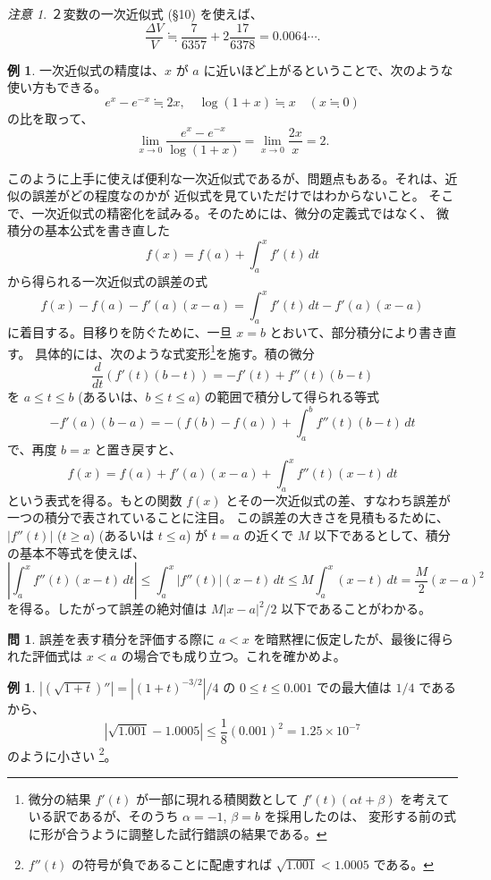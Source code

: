 \documentclass[a4paper]{jsarticle}
\theoremstyle{definition}
\newtheorem{Example}[Theorem]{例}
\newtheorem{Exercise}{問}%
\theoremstyle{remark}
\newtheorem{Remark}{注意}
\begin{document}
\begin{Remark}
  ２変数の一次近似式 (\S 10) を使えば、
  \[
    \frac{\Delta V}{V} \fallingdotseq \frac{7}{6357} + 2 \frac{17}{6378} = 0.0064\cdots. 
  \]
\end{Remark}

\begin{Example}
一次近似式の精度は、$x$ が $a$ に近いほど上がるということで、次のような使い方もできる。
\[
e^{x} - e^{-x} \fallingdotseq 2x, 
\quad 
\log(1+x) \fallingdotseq x 
\quad 
(x \fallingdotseq 0) 
\]
の比を取って、
\[
\lim_{x \to 0} \frac{e^x - e^{-x}}{\log(1+x)} = \lim_{x \to 0}\frac{2x}{x} = 2. 
\]
\end{Example}

このように上手に使えば便利な一次近似式であるが、問題点もある。それは、近似の誤差がどの程度なのかが
近似式を見ていただけではわからないこと。
そこで、一次近似式の精密化を試みる。そのためには、微分の定義式ではなく、
微積分の基本公式を書き直した
\[
f(x) = f(a) + \int_a^x f'(t)\, dt 
\]
から得られる一次近似式の誤差の式
\[
f(x) - f(a) - f'(a)(x-a) = \int_a^x f'(t)\,dt - f'(a)(x-a) 
\]
に着目する。目移りを防ぐために、一旦 $x=b$ とおいて、部分積分により書き直す。
具体的には、次のような式変形\footnote{微分の結果 $f'(t)$ が一部に現れる積関数として
  $f'(t)(\alpha t + \beta)$ を考えている訳であるが、そのうち $\alpha = -1$, $\beta = b$ を採用したのは、
  変形する前の式に形が合うように調整した試行錯誤の結果である。}を施す。積の微分
\[
\frac{d}{dt} 
\left( 
f'(t)(b-t) 
\right) 
= - f'(t) + f''(t)(b-t) 
\]
を $a \leq t \leq b$ (あるいは、$b \leq t \leq a$) の範囲で積分して得られる等式
\[
 - f'(a)(b-a) = - (f(b) - f(a)) + \int_a^b f''(t)(b-t)\, dt 
\]
で、再度 $b = x$ と置き戻すと、
\[
f(x) = f(a) + f'(a)(x-a) + \int_a^x f''(t)(x-t)\, dt 
\]
という表式を得る。もとの関数 $f(x)$ とその一次近似式の差、すなわち誤差が一つの積分で表されていることに注目。
この誤差の大きさを見積もるために、
$|f''(t)|$ ($t \geq a$) (あるいは $t \leq a$)
が $t=a$ の近くで $M$ 以下であるとして、積分の基本不等式を使えば、
\[
\left| \int_a^x f''(t)(x-t)\, dt \right|  
\leq \int_a^x |f''(t)| (x-t)\, dt 
\leq M \int_a^x (x-t)\, dt = \frac{M}{2} (x-a)^2 
\]
を得る。したがって誤差の絶対値は $M|x-a|^2/2$ 以下であることがわかる。

\begin{Exercise}
誤差を表す積分を評価する際に $a < x$ を暗黙裡に仮定したが、最後に得られた評価式は 
$x < a$ の場合でも成り立つ。これを確かめよ。
\end{Exercise} 

\begin{Example} 
$|(\sqrt{1+t})''| = |(1+t)^{-3/2}|/4$ の $0 \leq t \leq 0.001$ での最大値は $1/4$ であるから、
\[
|\sqrt{1.001} - 1.0005| \leq \frac{1}{8} (0.001)^2 = 1.25\times 10^{-7} 
\]
のように小さい
\footnote{$f''(t)$ の符号が負であることに配慮すれば $\sqrt{1.001} < 1.0005$ である。}。
\end{Example} 
\end{document}
